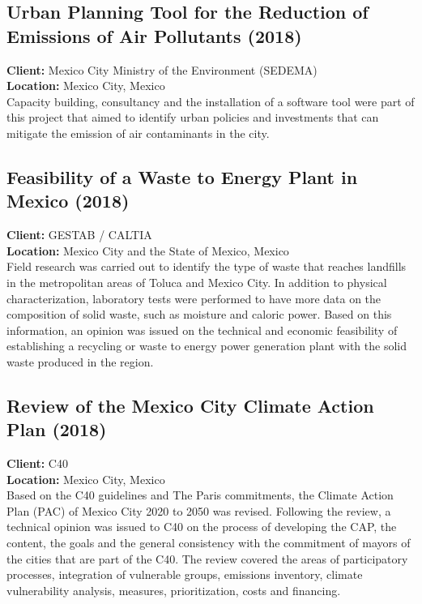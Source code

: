 \documentclass[
	a4paper,
	12pt,
	unnumberedsections,
]{CSSullivanBusinessReport}
\begin{document}
\subsection{Urban Planning Tool for the Reduction of Emissions of Air Pollutants (2018)}
\textbf{Client:}  Mexico City Ministry of the Environment (SEDEMA) \\
\textbf{Location:}  Mexico City, Mexico \\[0.5em]
 Capacity building, consultancy and the installation of a software tool were part of this project that aimed to identify urban policies and investments that can mitigate the emission of air contaminants in the city.

\subsection{Feasibility of a Waste to Energy Plant in Mexico (2018)}
\textbf{Client:}  GESTAB / CALTIA \\
\textbf{Location:}  Mexico City and the State of Mexico, Mexico \\[0.5em]
 Field research was carried out to identify the type of waste that reaches landfills in the metropolitan areas of Toluca and Mexico City. In addition to physical characterization, laboratory tests were performed to have more data on the composition of solid waste, such as moisture and caloric power. Based on this information, an opinion was issued on the technical and economic feasibility of establishing a recycling or waste to energy power generation plant with the solid waste produced in the region.

\subsection{Review of the Mexico City Climate Action Plan (2018)}
\textbf{Client:}  C40 \\
\textbf{Location:}  Mexico City, Mexico \\[0.5em]
 Based on the C40 guidelines and The Paris commitments, the Climate Action Plan (PAC) of Mexico City 2020 to 2050 was revised. Following the review, a technical opinion was issued to C40 on the process of developing the CAP, the content, the goals and the general consistency with the commitment of mayors of the cities that are part of the C40. The review covered the areas of participatory processes, integration of vulnerable groups, emissions inventory, climate vulnerability analysis, measures, prioritization, costs and financing.
\end{document}
